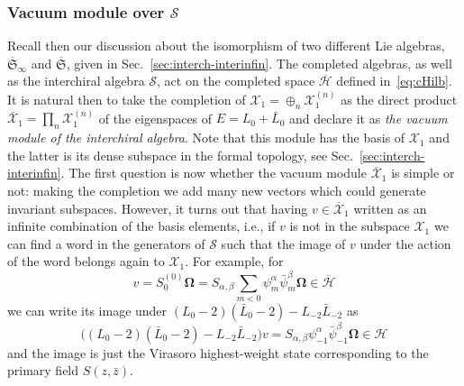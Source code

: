 \documentclass[11pt]{article}
\newcommand{\sferm}{\psi}
\newcommand{\bsferm}{\bar{\psi}}
\newcommand{\Hilb}{\mathcal{H}}
\newcommand{\cHilb}{\overline{\Hilb}}
\newcommand{\vac}{\boldsymbol{\Omega}}
\newcommand{\interLie}{\mathfrak{S}}
\newcommand{\interchco}{\overline{\interLie}}
\newcommand{\interchalg}{\mathcal{S}}
\newcommand{\bglinf}{\overline{\gl}_{\infty}}
\newcommand{\interinfinco}{\overline{\interLie}_{\infty}}
\newcommand{\interM}[1]{\mathscr{X}_{#1}}
\newcommand{\interMco}[1]{\overline{\mathscr{X}}_{#1}}
\newcommand{\nSU}{\boldsymbol{s\ell}}
\newcommand{\gl}{\mathfrak{gl}}
\newcommand{\bz}{\bar{z}}
\newcommand{\enrg}{S}
\theoremstyle{definition}
\begin{document}
\subsubsection{Vacuum module over $\interchalg$}\label{sec:interch-simple-2}
Recall then our discussion about the isomorphism of two different Lie algebras, $\interinfinco$ and $\interchco$, given in Sec.~\ref{sec:interch-interinfin}. The completed algebras, as well as the interchiral algebra $\interchalg$, act on the completed space $\cHilb$ defined in~\eqref{eq:cHilb}.
It is natural then to take the completion of  $\interM{1}=\oplus_n \interM{1}^{(n)}$ as the direct product $\interMco{1}=\prod_n \interM{1}^{(n)}$ of the eigenspaces of $E=L_0+\bar{L}_0$ and declare it as \textit{the vacuum module of the interchiral algebra}. Note that this module has the  basis of $\interM{1}$ and the latter is its dense subspace in the formal topology, see Sec.~\ref{sec:interch-interinfin}.
The first question is now whether the vacuum module $\interMco{1}$ is simple or not: making the completion we add many new vectors which could generate invariant subspaces.
However, it turns out that having $v\in\interMco{1}$ written as an infinite combination of the basis elements, i.e., if $v$ is not in the subspace $\interM{1}$ we can find a word in the generators of $\interchalg$ such that the image of $v$ under the action of the word belongs again to $\interM{1}$. For example, for
\begin{equation*}
v=\enrg^{(0)}_0\vac = S_{\alpha,\beta}\sum_{m<0}\sferm^{\alpha}_m\bsferm^{\beta}_m\vac\in\cHilb
\end{equation*}
we can write its image under $(L_0-2)(\bar{L}_0-2)-L_{-2}\bar{L}_{-2}$ as
\begin{equation*}
\bigl((L_0-2)(\bar{L}_0-2)-L_{-2}\bar{L}_{-2}\bigr)v=S_{\alpha,\beta}\sferm^{\alpha}_{-1}\bsferm^{\beta}_{-1}\vac\in\Hilb
\end{equation*}
and the image is just the Virasoro highest-weight state corresponding to the primary field $\enrg(z,\bz)$.


\end{document}
